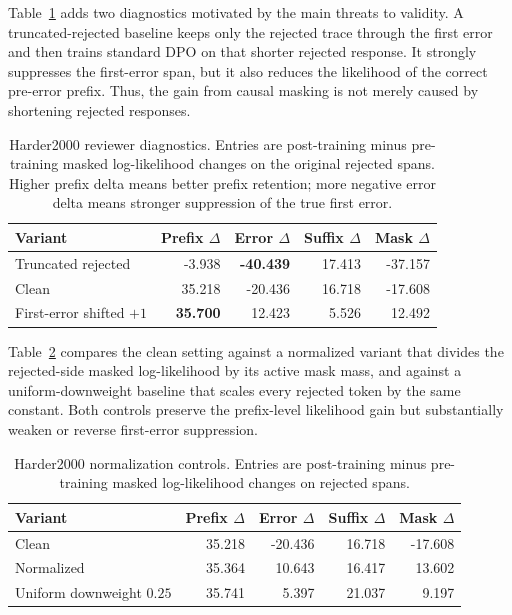 Table~\ref{tab:reviewer-baselines} adds two diagnostics motivated by the main threats to validity. A truncated-rejected baseline keeps only the rejected trace through the first error and then trains standard DPO on that shorter rejected response. It strongly suppresses the first-error span, but it also reduces the likelihood of the correct pre-error prefix. Thus, the gain from causal masking is not merely caused by shortening rejected responses.

\begin{table}[h]
\caption{Harder2000 reviewer diagnostics. Entries are post-training minus pre-training masked log-likelihood changes on the original rejected spans. Higher prefix delta means better prefix retention; more negative error delta means stronger suppression of the true first error.}
\label{tab:reviewer-baselines}
\begin{center}
\begin{tabular}{lrrrr}
\toprule
Variant & Prefix $\Delta$ & Error $\Delta$ & Suffix $\Delta$ & Mask $\Delta$ \\
\midrule
Truncated rejected & -3.938 & \textbf{-40.439} & 17.413 & -37.157 \\
Clean \cmdpo{} & 35.218 & -20.436 & 16.718 & -17.608 \\
First-error shifted $+1$ & \textbf{35.700} & 12.423 & 5.526 & 12.492 \\
\bottomrule
\end{tabular}
\end{center}
\end{table}

Table~\ref{tab:normalization} compares the clean \cmdpo{} setting against a normalized variant that divides the rejected-side masked log-likelihood by its active mask mass, and against a uniform-downweight baseline that scales every rejected token by the same constant. Both controls preserve the prefix-level likelihood gain but substantially weaken or reverse first-error suppression.

\begin{table}[h]
\caption{Harder2000 normalization controls. Entries are post-training minus pre-training masked log-likelihood changes on rejected spans.}
\label{tab:normalization}
\begin{center}
\begin{tabular}{lrrrr}
\toprule
Variant & Prefix $\Delta$ & Error $\Delta$ & Suffix $\Delta$ & Mask $\Delta$ \\
\midrule
Clean \cmdpo{} & 35.218 & -20.436 & 16.718 & -17.608 \\
Normalized \cmdpo{} & 35.364 & 10.643 & 16.417 & 13.602 \\
Uniform downweight $0.25$ & 35.741 & 5.397 & 21.037 & 9.197 \\
\bottomrule
\end{tabular}
\end{center}
\end{table}

